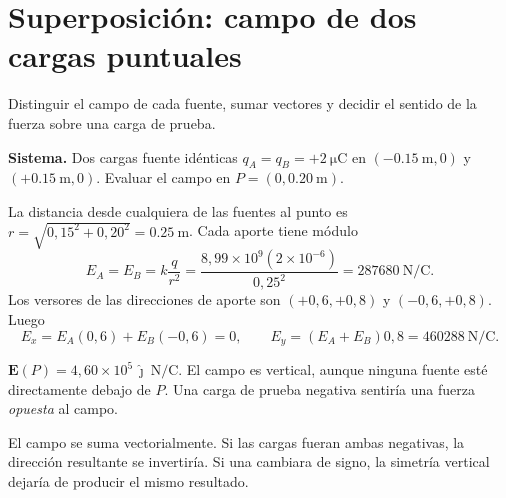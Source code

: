 \documentclass[11pt,a4paper]{article}
\newcommand{\ej}[2]{\clearpage\section{#2}}
\newcommand{\vect}[1]{\boldsymbol{#1}}
\begin{document}
\ej{2}{Superposición: campo de dos cargas puntuales}
\begin{objetivo}Distinguir el campo de cada fuente, sumar vectores y decidir el sentido de la fuerza sobre una carga de prueba.\end{objetivo}
\textbf{Sistema.} Dos cargas fuente idénticas $q_A=q_B=+\SI{2}{\micro\coulomb}$ en $(-\SI{0.15}{\metre},0)$ y $(+\SI{0.15}{\metre},0)$. Evaluar el campo en $P=(0,\SI{0.20}{\metre})$.
\begin{center}\end{center}
\begin{metodo}
La distancia desde cualquiera de las fuentes al punto es $r=\sqrt{0{,}15^2+0{,}20^2}=\SI{0.25}{\metre}$. Cada aporte tiene módulo
\[E_A=E_B=k\frac{q}{r^2}=\frac{8{,}99\times10^9(2\times10^{-6})}{0{,}25^2}=\SI{287680}{\newton\per\coulomb}.\]
Los versores de las direcciones de aporte son $(+0{,}6,+0{,}8)$ y $(-0{,}6,+0{,}8)$. Luego
\[E_x=E_A(0{,}6)+E_B(-0{,}6)=0,\qquad E_y=(E_A+E_B)0{,}8=\SI{460288}{\newton\per\coulomb}.\]
\end{metodo}
\begin{resultado}$\boxed{\vect E(P)=4{,}60\times10^5\,\hat\jmath\ \si{\newton\per\coulomb}}$. El campo es vertical, aunque ninguna fuente esté directamente debajo de $P$. Una carga de prueba negativa sentiría una fuerza \emph{opuesta} al campo.\end{resultado}
\begin{alerta}El campo se suma vectorialmente. Si las cargas fueran ambas negativas, la dirección resultante se invertiría. Si una cambiara de signo, la simetría vertical dejaría de producir el mismo resultado.\end{alerta}
\end{document}
